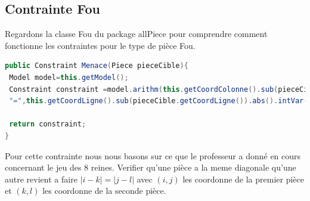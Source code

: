 \documentclass[a4paper,10pt]{article}
\begin{document}
\subsection{Contrainte Fou}
\par Regardons la classe Fou du package allPiece pour comprendre comment fonctionne les contraintes pour le type de pièce Fou.
\begin{lstlisting}[language=Java,basicstyle=\tiny]
public Constraint Menace(Piece pieceCible){
 Model model=this.getModel();
 Constraint constraint =model.arithm(this.getCoordColonne().sub(pieceCible.getCoordColonne()).abs().intVar(),
 "=",this.getCoordLigne().sub(pieceCible.getCoordLigne()).abs().intVar());
	   
 return constraint;
}
\end{lstlisting}

Pour cette contrainte nous nous basons sur ce que le professeur a donné en cours concernant le jeu des 8 reines. Verifier qu'une pièce a la meme diagonale qu'une autre revient a faire $|i-k|=|j-l|$ avec $(i,j)$ les coordonne de la premier pièce et $(k,l)$ les coordonne de la seconde pièce.
\end{document}
